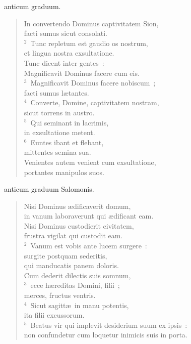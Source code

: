 \bchapter[Psalm]
anticum graduum. \begin{verse}In convertendo Dominus captivitatem Sion,\\ facti sumus sicut consolati.\\
${}^{2}$~Tunc repletum est gaudio os nostrum,\\ et lingua nostra exsultatione.\\ Tunc dicent inter gentes~:\\ Magnificavit Dominus facere cum eis.\\
${}^{3}$~Magnificavit Dominus facere nobiscum~;\\ facti sumus l\ae tantes.\\
${}^{4}$~Converte, Domine, captivitatem nostram,\\ sicut torrens in austro.\\
${}^{5}$~Qui seminant in lacrimis,\\ in exsultatione metent.\\
${}^{6}$~Euntes ibant et flebant,\\ mittentes semina sua.\\ Venientes autem venient cum exsultatione,\\ portantes manipulos suos.\end{verse}



\bchapter[Psalm]
anticum graduum Salomonis. \begin{verse}Nisi Dominus \ae dificaverit domum,\\ in vanum laboraverunt qui \ae dificant eam.\\ Nisi Dominus custodierit civitatem,\\ frustra vigilat qui custodit eam.\\
${}^{2}$~Vanum est vobis ante lucem surgere~:\\ surgite postquam sederitis,\\ qui manducatis panem doloris.\\ Cum dederit dilectis suis somnum,\\
${}^{3}$~ecce h\ae reditas Domini, filii~;\\ merces, fructus ventris.\\
${}^{4}$~Sicut sagitt\ae\ in manu potentis,\\ ita filii excussorum.\\
${}^{5}$~Beatus vir qui implevit desiderium suum ex ipsis~:\\ non confundetur cum loquetur inimicis suis in porta.\end{verse}



